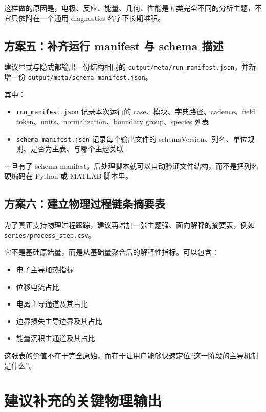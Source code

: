 \documentclass[11pt,a4paper]{ctexart}
\newcommand{\file}[1]{\texttt{#1}}
\begin{document}
这样做的原因是，电极、反应、能量、几何、性能是五类完全不同的分析主题，不宜只依附在一个通用 diagnostics 名字下长期堆积。

\subsection{方案五：补齐运行 manifest 与 schema 描述}

建议显式与隐式都输出一份结构相同的 \file{output/meta/run\_manifest.json}，并新增一份 \file{output/meta/schema\_manifest.json}。

其中：

\begin{itemize}
  \item \file{run\_manifest.json} 记录本次运行的 case、模块、字典路径、cadence、field token、units、normalization、boundary group、species 列表
  \item \file{schema\_manifest.json} 记录每个输出文件的 schemaVersion、列名、单位规则、是否为主表、与哪个主题关联
\end{itemize}

一旦有了 schema manifest，后处理脚本就可以自动验证文件结构，而不是把列名硬编码在 Python 或 MATLAB 脚本里。

\subsection{方案六：建立物理过程链条摘要表}

为了真正支持物理过程跟踪，建议再增加一张主题强、面向解释的摘要表，例如 \file{series/process\_step.csv}。

它不是基础原始量，而是从基础量聚合后的解释性指标。可以包含：

\begin{itemize}
  \item 电子主导加热指标
  \item 位移电流占比
  \item 电离主导通道及其占比
  \item 边界损失主导边界及其占比
  \item 能量沉积主通道及其占比
\end{itemize}

这张表的价值不在于完全原始，而在于让用户能够快速定位“这一阶段的主导机制是什么”。

\section{建议补充的关键物理输出}
\end{document}

